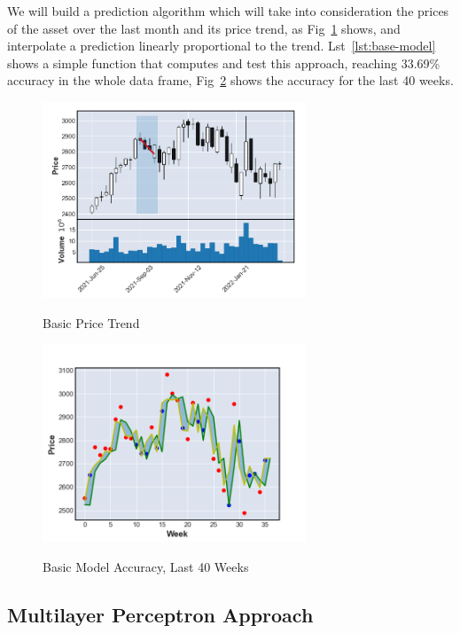We will build a prediction algorithm which will take into consideration the prices of the asset over the last month and its price trend, as Fig~\ref{fig:price-trend} shows, and interpolate a prediction linearly proportional to the trend. Lst~\ref{lst:base-model} shows a simple function that computes and test this approach, reaching 33.69\% accuracy in the whole data frame, Fig~\ref{fig:basic-acurracy} shows the accuracy for the last 40 weeks.

\begin{figure}[H]
    \centering
    \caption{Basic Price Trend}
    \includegraphics[width=0.7\textwidth]{figures/baselineCalc.png}
    \label{fig:price-trend}
\end{figure}

\begin{figure}[H]
    \centering
    \caption{Basic Model Accuracy, Last 40 Weeks}
    \includegraphics[width=0.7\textwidth]{figures/simple.png}
    \label{fig:basic-acurracy}
\end{figure}

\subsection{Multilayer Perceptron Approach}


